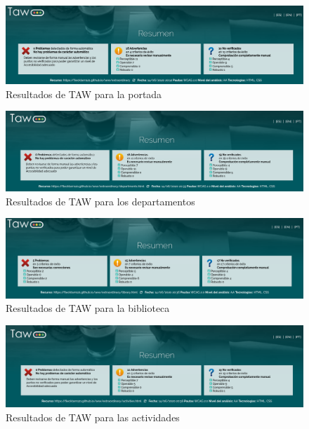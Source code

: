 \documentclass[11pt]{article}
\begin{document}
\begin{figure}[h]
    \centering
    \includegraphics[width=\textwidth]{taw1.png}
    \caption{Resultados de TAW para la portada}
\end{figure}

\begin{figure}[h]
    \centering
    \includegraphics[width=\textwidth]{taw2.png}
    \caption{Resultados de TAW para los departamentos}
\end{figure}

\begin{figure}[h]
    \centering
    \includegraphics[width=\textwidth]{taw3.png}
    \caption{Resultados de TAW para la biblioteca}
\end{figure}

\begin{figure}[h]
    \centering
    \includegraphics[width=\textwidth]{taw4.png}
    \caption{Resultados de TAW para las actividades}
\end{figure}
\end{document}
